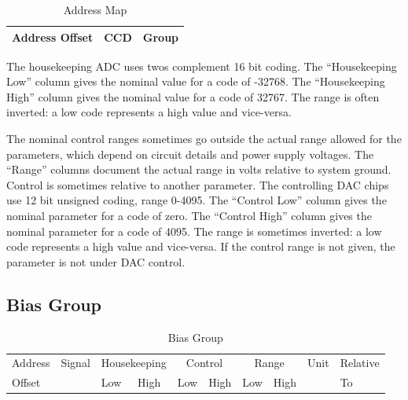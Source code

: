\documentclass[12pt]{article}
\let\oldsubsection\subsection
\renewcommand{\subsection}{\FloatBarrier\oldsubsection}
\begin{document}
\begin{table}[ht!]
\caption{Address Map}
\begin{center}
\begin{tabular}{|l|l|l|}
\hline
Address Offset & CCD & Group \\
\hline

\hline
\end{tabular}
\end{center}
\vspace{5pt}

\label{hkmap}
\end{table}

The housekeeping ADC uses twos complement 16 bit coding. The ``Housekeeping Low'' column gives the nominal value for a code of -32768. The ``Housekeeping High'' column gives the nominal value for a code of 32767. The range is often inverted: a low code represents a high value and vice-versa.

The nominal control ranges sometimes go outside the actual range allowed for the parameters, which depend on circuit details and power supply voltages. The ``Range'' columns document the actual range in volts relative to system ground. Control is sometimes relative to another parameter. The controlling DAC chips use 12 bit unsigned coding, range 0-4095. The ``Control Low'' column gives the nominal parameter for a code of zero. The ``Control High'' column gives the nominal parameter for a code of 4095. The range is sometimes inverted: a low code represents a high value and vice-versa. If the control range is not given, the parameter is not under DAC control.
\subsection{Bias Group}
\begin{table}[ht!]
\caption{Bias Group}
\begin{center}
\begin{tabular}{|l|l|l|l|l|l|l|l|l|l|}
\hline
Address & Signal & \multicolumn{2}{c|}{Housekeeping} &  \multicolumn{2}{c|}{Control} &  \multicolumn{2}{c|}{Range} &Unit & Relative \\
Offset &  & Low & High & Low & High & Low & High &  & To  \\
\hline

\hline
\end{tabular}
\end{center}
\vspace{5pt}

\label{biastab}
\end{table}
\end{document}
